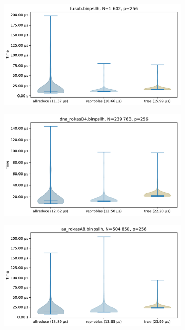 \begin{figure}\centering\ContinuedFloat

\begin{subfigure}{\textwidth}
\centering
\includegraphics[scale=\mScale]{figures/violinFusob.pdf}
\end{subfigure}

\begin{subfigure}{\textwidth}
\centering
\includegraphics[scale=\mScale]{figures/violinRokasD4.pdf}
\end{subfigure}

\begin{subfigure}{\textwidth}
\centering
\includegraphics[scale=\mScale]{figures/violinRokasA8.pdf}
\end{subfigure}

\end{figure}
